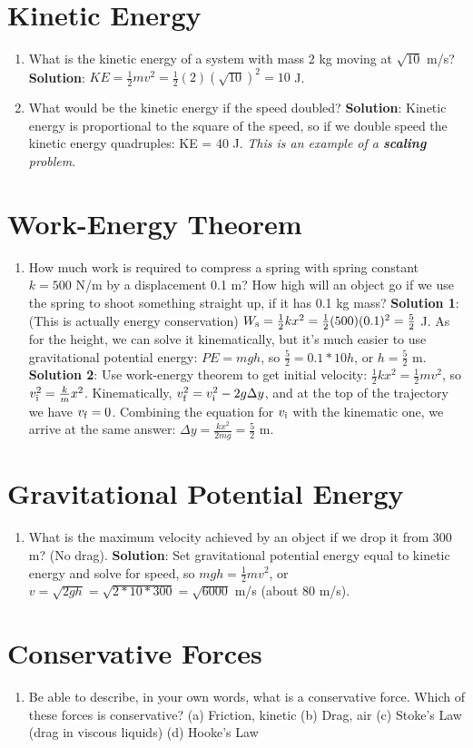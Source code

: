 \documentclass[10pt]{article}
\begin{document}
\section{Kinetic Energy}
\begin{enumerate}
\item What is the kinetic energy of a system with mass 2 kg moving at $\sqrt{10}$ m/s? \textbf{Solution}: $KE = \frac{1}{2}mv^2 = \frac{1}{2}(2)(\sqrt{10})^2 = 10$ J.
\item What would be the kinetic energy if the speed doubled?  \textbf{Solution}: Kinetic energy is proportional to the square of the speed, so if we double speed the kinetic energy quadruples: KE = 40 J. \textit{This is an example of a \textbf{scaling} problem}.
\end{enumerate}
\section{Work-Energy Theorem}
\begin{enumerate}
\item How much work is required to compress a spring with spring constant $k = 500$ N/m by a displacement 0.1 m?  How high will an object go if we use the spring to shoot something straight up, if it has 0.1 kg mass?  \textbf{Solution 1}: (This is actually energy conservation) $W_{\rm s} = \frac{1}{2}kx^2 = \frac{1}{2}(500)(0.1)^2 = \frac{5}{2}$ J.  As for the height, we can solve it kinematically, but it's much easier to use gravitational potential energy: $PE = mgh$, so $\frac{5}{2} = 0.1 * 10 h$, or $h = \frac{5}{2}$ m. \textbf{Solution 2}: Use work-energy theorem to get initial velocity: $\frac{1}{2}kx^2 = \frac{1}{2}mv^2$, so $v_{\rm i}^2 = \frac{k}{m}x^2$.  Kinematically, $v_{\rm f}^2 = v_{\rm i}^2 - 2g\Delta y$, and at the top of the trajectory we have $v_{\rm f} = 0$.  Combining the equation for $v_{\rm i}$ with the kinematic one, we arrive at the same answer: $\Delta y = \frac{kx^2}{2mg} = \frac{5}{2}$ m.
\end{enumerate}
\section{Gravitational Potential Energy}
\begin{enumerate}
\item What is the maximum velocity achieved by an object if we drop it from 300 m?  (No drag).  \textbf{Solution}: Set gravitational potential energy equal to kinetic energy and solve for speed, so $mgh = \frac{1}{2} m v^2$, or $v = \sqrt{2gh} = \sqrt{2*10*300} = \sqrt{6000}$ m/s (about 80 m/s).
\end{enumerate}
\section{Conservative Forces}
\begin{enumerate}
\item Be able to describe, in your own words, what is a conservative force.  Which of these forces is conservative?  (a) Friction, kinetic (b) Drag, air (c) Stoke's Law (drag in viscous liquids) (d) Hooke's Law
\end{enumerate}
\end{document}
